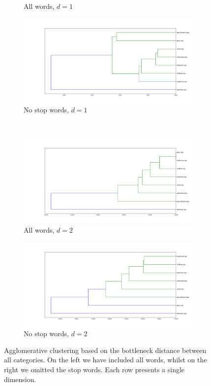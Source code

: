 \documentclass[fleqn]{article}
\begin{document}
\begin{figure}
\begin{subfigure}[t]{0.475\textwidth}
    	\caption{All words, $d =1$}
        \label{fig:all:d1}
    \end{subfigure}\hfill
	\begin{subfigure}[t]{0.475\textwidth}
        \includegraphics[width=\textwidth]{figures/stopwords_excluded/dendrogram_d1.png}
    	\caption{No stop words, $d = 1$}
        \label{fig:sw:d1}
    \end{subfigure}\hfill
    \\
	\begin{subfigure}[t]{0.475\textwidth}
    	\includegraphics[width=\textwidth]{figures/all_words/dendrogram_d2.png}
    	\caption{All words, $d = 2$}
        \label{fig:all:d2}
    \end{subfigure}\hfill
	\begin{subfigure}[t]{0.475\textwidth}
        \includegraphics[width=\textwidth]{figures/stopwords_excluded/dendrogram_d2.png}
    	\caption{No stop words, $d = 2$}
        \label{fig:sw:d2}
    \end{subfigure}\hfill
    \caption{Agglomerative clustering based on the bottleneck distance between all categories. On the left we have included all words, whilst on the right we omitted the stop words. Each row presents a single dimension.}
    \label{fig:dendro}
\end{figure}



\end{document}
